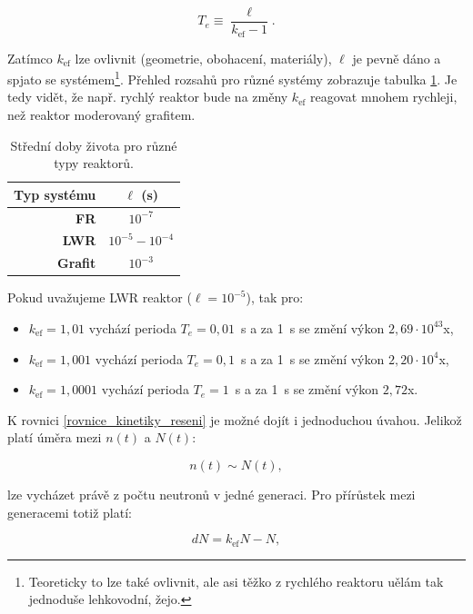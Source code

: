 \begin{equation}
  \boxed{
  T_e \equiv \dfrac{\ell}{k_{\text{ef}} - 1}.
  \label{perioda}}
\end{equation}

Zatímco $k_{\text{ef}}$ lze ovlivnit (geometrie, obohacení, materiály), $\ell$ je pevně dáno a spjato se systémem\footnote{Teoreticky to lze také ovlivnit, ale asi těžko z rychlého reaktoru uělám tak jednoduše lehkovodní, žejo.}. Přehled rozsahů pro různé systémy zobrazuje tabulka \ref{table_stredni_doby_zivota}. Je tedy vidět, že např. rychlý reaktor bude na změny $k_{\text{ef}}$ reagovat mnohem rychleji, než reaktor moderovaný grafitem.\\

\begin{table}[H]
\centering
\caption{Střední doby života pro různé typy reaktorů.}
\label{table_stredni_doby_zivota}
\begin{tabular}{@{}rc@{}}
\toprule
\textbf{Typ systému} & $\ell$ (s)           \\ \midrule
\textbf{FR}          & $10^{-7}$            \\
\textbf{LWR}         & $10^{-5} - 10^{-4}$  \\
\textbf{Grafit}      & $10^{-3}$            \\ \bottomrule
\end{tabular}
\end{table}

Pokud uvažujeme LWR reaktor ($\ell = 10^{-5}$), tak pro:

\begin{itemize}
  \item $k_{\text{ef}} = 1,01$ vychází perioda $T_e = 0,01$~s a za 1~s se změní výkon $2,69 \cdot 10^{43}$x,
  \item $k_{\text{ef}} = 1,001$ vychází perioda $T_e = 0,1$~s a za 1~s se změní výkon $2,20 \cdot 10^{4}$x,
  \item $k_{\text{ef}} = 1,0001$ vychází perioda $T_e = 1$~s a za 1~s se změní výkon $2,72$x.
\end{itemize}

K rovnici \eqref{rovnice_kinetiky_reseni} je možné dojít i jednoduchou úvahou. Jelikož platí úměra mezi $n(t)$ a $N(t)$:

$$ n(t) \sim N(t), $$

lze vycházet právě z počtu neutronů v jedné generaci. Pro přírůstek mezi generacemi totiž platí:

$$ dN = k_{\text{ef}}N - N, $$

